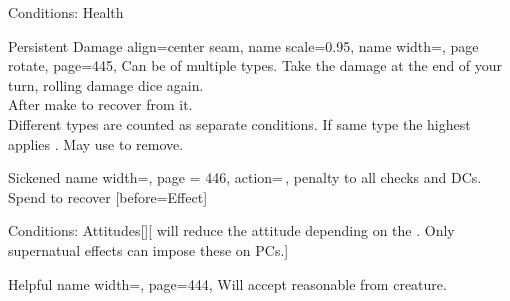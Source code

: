 \begin{PageFront}
\begin{Tables}{\frontTableHeight}
\begin{Table}{Conditions: Health}
            \begin{entry}{Persistent Damage}{%
                align=center seam,
                name scale=0.95,
                name width=\conditionLength,%
                page rotate,
                page=445,
            }
                Can be of multiple types. Take the damage at the end of your turn, rolling damage dice again.\hfill
                \\
                After make \Flat[][val=15] to recover from it. \hfill {}\\
                Different types are counted as separate conditions. If same type the highest applies . \hfill May use  to remove.
            \end{entry}
            \begin{entry}{Sickened}{%
                name width=\conditionLength,%
                page = 446,
                action=\,\X,
            }
                \Numb{-\X} \Status penalty to all checks and DCs. Spend  to recover
                [before=Effect]
                \hfill {}
            \end{entry}
        \end{Table}
        \TableSpace
        \begin{Table}{Conditions: Attitudes}[][ will reduce the attitude depending on the \GM.
        \quad Only supernatual effects can impose these on PCs.]
            \begin{entry}{Helpful}{%
                name width=\conditionLength,%
                page=444,
            }
                Will accept reasonable  from creature. \hfill {}

\end{entry}
\end{Table}
\end{Tables}
\end{PageFront}
